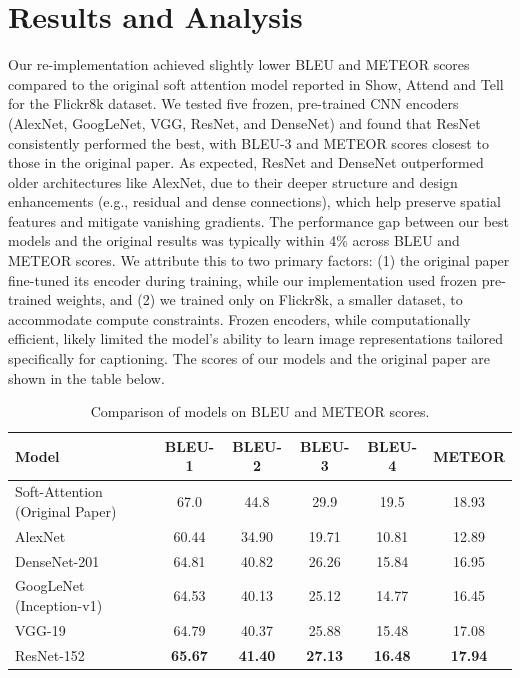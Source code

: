 \documentclass{article}
\begin{document}
\section{Results and Analysis}
Our re-implementation achieved slightly lower BLEU and METEOR scores compared to the original soft attention model reported in Show, Attend and Tell for the Flickr8k dataset. We tested five frozen, pre-trained CNN encoders (AlexNet, GoogLeNet, VGG, ResNet, and DenseNet) and found that ResNet consistently performed the best, with BLEU-3 and METEOR scores closest to those in the original paper. As expected, ResNet and DenseNet outperformed older architectures like AlexNet, due to their deeper structure and design enhancements (e.g., residual and dense connections), which help preserve spatial features and mitigate vanishing gradients.
The performance gap between our best models and the original results was typically within 4\% across BLEU and METEOR scores. We attribute this to two primary factors: (1) the original paper fine-tuned its encoder during training, while our implementation used frozen pre-trained weights, and (2) we trained only on Flickr8k, a smaller dataset, to accommodate compute constraints. Frozen encoders, while computationally efficient, likely limited the model’s ability to learn image representations tailored specifically for captioning. The scores of our models and the original paper are shown in the table below.

\begin{table}[h]
\centering
\caption{Comparison of models on BLEU and METEOR scores.}
\label{tab:mytable}
\begin{adjustbox}{width=.75\textwidth}
\small
\begin{tabular}{lccccc}
\toprule
Model & BLEU-1 & BLEU-2 & BLEU-3 & BLEU-4 & METEOR \\
\midrule
Soft-Attention (Original Paper) & 67.0 & 44.8 & 29.9 & 19.5 & 18.93 \\
AlexNet                & 60.44 & 34.90 & 19.71 & 10.81 & 12.89 \\
DenseNet-201               & 64.81 & 40.82 & 26.26 & 15.84 & 16.95 \\
GoogLeNet (Inception-v1)              & 64.53 & 40.13 & 25.12 & 14.77 & 16.45 \\
VGG-19                    & 64.79 & 40.37 & 25.88 & 15.48 & 17.08 \\
ResNet-152                 & \textbf{65.67} & \textbf{41.40} & \textbf{27.13} & \textbf{16.48} & \textbf{17.94} \\
\bottomrule
\end{tabular}
\end{adjustbox}
\end{table}
\end{document}
